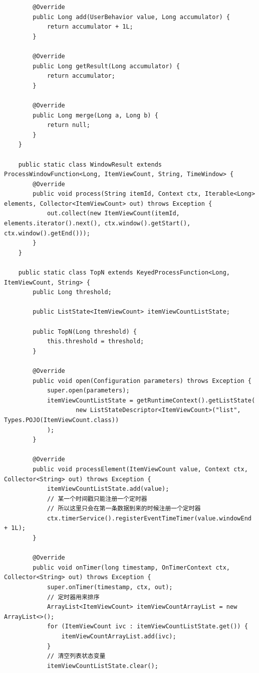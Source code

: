 \documentclass[cn,11pt,chinese]{elegantbook}
\begin{document}
\begin{verbatim}
        @Override
        public Long add(UserBehavior value, Long accumulator) {
            return accumulator + 1L;
        }

        @Override
        public Long getResult(Long accumulator) {
            return accumulator;
        }

        @Override
        public Long merge(Long a, Long b) {
            return null;
        }
    }

    public static class WindowResult extends ProcessWindowFunction<Long, ItemViewCount, String, TimeWindow> {
        @Override
        public void process(String itemId, Context ctx, Iterable<Long> elements, Collector<ItemViewCount> out) throws Exception {
            out.collect(new ItemViewCount(itemId, elements.iterator().next(), ctx.window().getStart(), ctx.window().getEnd()));
        }
    }

    public static class TopN extends KeyedProcessFunction<Long, ItemViewCount, String> {
        public Long threshold;

        public ListState<ItemViewCount> itemViewCountListState;

        public TopN(Long threshold) {
            this.threshold = threshold;
        }

        @Override
        public void open(Configuration parameters) throws Exception {
            super.open(parameters);
            itemViewCountListState = getRuntimeContext().getListState(
                    new ListStateDescriptor<ItemViewCount>("list", Types.POJO(ItemViewCount.class))
            );
        }

        @Override
        public void processElement(ItemViewCount value, Context ctx, Collector<String> out) throws Exception {
            itemViewCountListState.add(value);
            // 某一个时间戳只能注册一个定时器
            // 所以这里只会在第一条数据到来的时候注册一个定时器
            ctx.timerService().registerEventTimeTimer(value.windowEnd + 1L);
        }

        @Override
        public void onTimer(long timestamp, OnTimerContext ctx, Collector<String> out) throws Exception {
            super.onTimer(timestamp, ctx, out);
            // 定时器用来排序
            ArrayList<ItemViewCount> itemViewCountArrayList = new ArrayList<>();
            for (ItemViewCount ivc : itemViewCountListState.get()) {
                itemViewCountArrayList.add(ivc);
            }
            // 清空列表状态变量
            itemViewCountListState.clear();


\end{verbatim}
\end{document}
